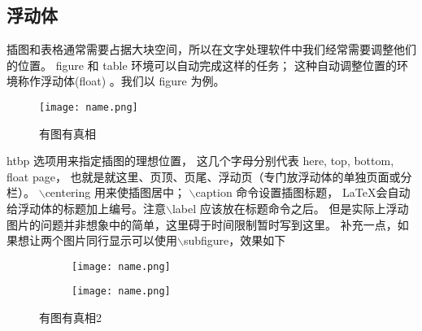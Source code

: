 \subsection{浮动体}
插图和表格通常需要占据大块空间，所以在文字处理软件中我们经常需要调整他们的位置。
figure 和 table 环境可以自动完成这样的任务；
这种自动调整位置的环境称作浮动体(float) 。我们以 figure 为例。
\begin{figure}[htbp]
    \centering
    \texttt{[image: name.png]}
    \caption{有图有真相}
    \label{fig:myphoto}
\end{figure}
htbp 选项用来指定插图的理想位置，
这几个字母分别代表 here, top, bottom, float page，
也就是就这里、页顶、页尾、浮动页（专门放浮动体的单独页面或分栏）。
$\backslash$centering 用来使插图居中；
$\backslash$caption 命令设置插图标题，
LaTeX会自动给浮动体的标题加上编号。注意$\backslash$label 应该放在标题命令之后。
但是实际上浮动图片的问题并非想象中的简单，这里碍于时间限制暂时写到这里。
补充一点，如果想让两个图片同行显示可以使用$\backslash$subfigure，效果如下
\begin{figure}[htbp]
    \centering
    \begin{subfigure}[b]{0.45\textwidth}
        \texttt{[image: name.png]}
        \label{fig:image1}
    \end{subfigure}
    \hfill
    \begin{subfigure}[b]{0.45\textwidth}
        \texttt{[image: name.png]}
        \label{fig:image2}
    \end{subfigure}
    \caption{有图有真相2}
    \label{fig:twosubfigs004}
\end{figure}